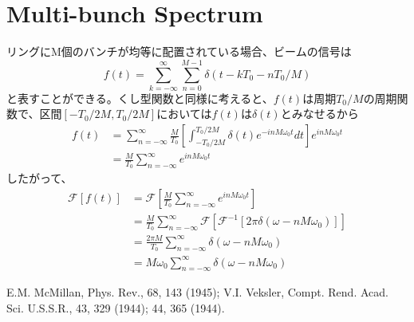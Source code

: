 \documentclass[]{jlreq}
\begin{document}
\section{Multi-bunch Spectrum}
リングにM個のバンチが均等に配置されている場合、ビームの信号は
%
\begin{equation}
  f(t) = \sum_{k=-\infty}^{\infty} \sum_{n=0}^{M-1}\delta (t - k T_0 -n T_0 / M)
\end{equation}
%
と表すことができる。くし型関数と同様に考えると、$f(t)$は周期$T_0/M$の周期関数で、区間$[-T_0/2M, T_0/2M]$においては$f(t)$は$\delta(t)$とみなせるから
%
%
\begin{align}
  f(t) &= \sum_{n = -\infty}^{\infty} \frac{M}{T_0} \left[\int_{-T_0/2M}^{T_0/2M}\delta (t) e^{-i n M \omega_0 t} dt\right] 
  e^{i n M \omega_0 t} \\
              &= \frac{M}{T_0} \sum_{n = -\infty}^{\infty} e^{i n M \omega_0 t} 
\end{align}
%
したがって、
%
\begin{align}
  \mathcal{F}[f(t)] &= \mathcal{F}\left[\frac{M}{T_0} \sum_{n = -\infty}^{\infty} e^{i n M \omega_0 t}\right] \\ 
      & = \frac{M}{T_0} \sum_{n = -\infty}^{\infty} \mathcal{F}[\mathcal{F}^{-1}[2\pi \delta(\omega - n M \omega_0)]] \\ 
      & = \frac{2 \pi M}{T_0} \sum_{n = -\infty}^{\infty} \delta(\omega - n M \omega_0)\\ 
      &= M \omega_0 \sum_{n = -\infty}^{\infty} \delta(\omega - n M \omega_0)
\end{align}
%
\begin{thebibliography}{9}
  E.M. McMillan, Phys. Rev., 68, 143 (1945); V.I. Veksler, Compt. Rend. Acad. Sci. U.S.S.R., 43, 329 (1944); 44, 365 (1944).

\end{thebibliography}
%
\end{document}
